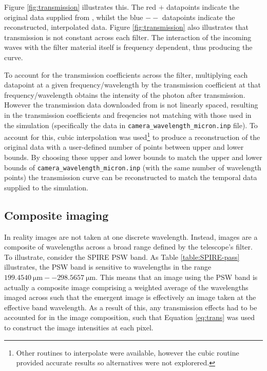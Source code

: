 \documentclass{report}
\begin{document}
Figure \ref{fig:transmission} illustrates this. The red $+$ datapoints indicate the original data supplied from \textcite{pass}, whilst the blue $--$ datapoints indicate the reconstructed, interpolated data. Figure \ref{fig:transmission} also illustrates that transmission is not constant across each filter. The interaction of the incoming waves with the filter material itself is frequency dependent, thus producing the curve.

To account for the transmission coefficients across the filter, multiplying each datapoint at a given frequency/wavelength by the transmission coefficient at that frequency/wavelength obtains the intensity of the photon after transmission. However the transmission data downloaded from \textcite{pass} is not linearly spaced, resulting in the transmission coefficients and freqencies not matching with those used in the simulation (specifically the data in \texttt{camera\_wavelength\_micron.inp} file). To account for this, cubic interpolation was used\footnote{Other routines to interpolate were available, however the cubic routine provided accurate results so alternatives were not explorered.} to produce a reconstruction of the original data with a user-defined number of points between upper and lower bounds. By choosing these upper and lower bounds to match the upper and lower bounds of \texttt{camera\_wavelength\_micron.inp} (with the same number of wavelength points) the transmission curve can be reconstructed to match the temporal data supplied to the simulation.

\subsection{Composite imaging} \label{comp}
In reality images are not taken at one discrete wavelength. Instead, images are a composite of wavelengths across a broad range defined by the telescope's filter. To illustrate, consider the SPIRE PSW band. As Table \ref{table:SPIRE-pass} illustrates, the PSW band is sensitive to wavelengths in the range $\SI{199.4540}{\micro\meter} --	\SI{298.5657}{\micro\meter}$. This means that an image using the PSW band is actually a composite image comprising a weighted average of the wavelengths imaged across such that the emergent image is effectively an image taken at the effective band wavelength. As a result of this, any transmission effects had to be accounted for in the image composition, such that Equation \ref{eq:trans} was used to construct the image intensities at each pixel.
\end{document}

